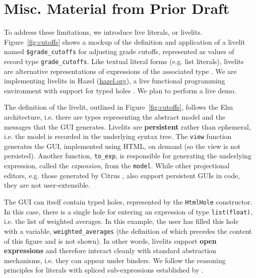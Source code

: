 \documentclass[acmsmall,review,anonymous,nonacm]{acmart}
\newcommand{\li}[1]{\lstinline[basicstyle=\ttfamily\fontsize{9pt}{1em}\selectfont]{#1}}
\theoremstyle{slplain}
\numberwithin{thm}{section}
\begin{document}









\clearpage
\appendix
\section{Misc. Material from Prior Draft}

To address these limitations, we introduce live literals, or livelits. Figure~\ref{fig:cutoffs} shows a mockup of the definition and application of a livelit named \li{$grade_cutoffs} for adjusting grade cutoffs, represented as values of  record type \li{grade_cutoffs}. Like textual literal forms (e.g. list literals), livelits are alternative representations of expressions of the associated type \cite{DBLP:journals/pacmpl/OmarA18}. %
We are implementing livelits in Hazel (\url{hazel.org}), a live functional programming environment with support for typed holes \cite{popl-paper}. We plan to perform a live demo.




The definition of
the livelit, outlined in Figure~\ref{fig:cutoffs}, follows the Elm architecture,
i.e. there are types representing the abstract model and the messages that the 
GUI generates. Livelits are \textbf{persistent} rather than ephemeral, i.e. the model is recorded in the underlying syntax tree. The \li{view} function generates the GUI, implemented using HTML, on demand (so the view is not persisted). Another function, \li{to_exp}, is responsible for generating the underlying expression, called the \emph{expansion}, from the \li{model}. 
While other projectional editors, e.g. those generated by Citrus \cite{DBLP:conf/uist/KoM05}, also support persistent GUIs in code, they are not user-extensible. 

The GUI can itself contain typed holes, represented by the \li{HtmlHole} constructor. In this case, there is a single hole
for entering an expression of type \li{list(float)}, i.e. the list of weighted
averages. In this example, the user has filled this hole with a variable,
\li{weighted_averages} (the definition of which precedes the content of this figure and is not shown). In other words,
livelits support \textbf{open expressions} and therefore interact cleanly with 
standard abstraction mechanisms, i.e. they can appear under binders. We follow the reasoning principles for literals with spliced sub-expressions established  by \citet{DBLP:journals/pacmpl/OmarA18}.
\end{document}

